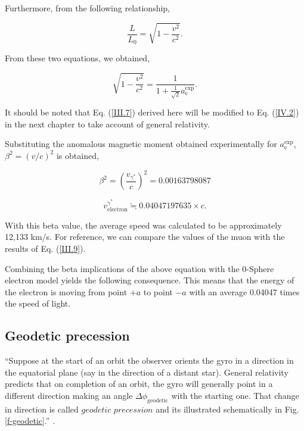 \documentclass[%
 reprint,
 amsmath,amssymb,
 aps,
]{revtex4-1}
\numberwithin{equation}{section}%
\begin{document}
Furthermore, from the following relationship,

    \begin{equation}
        \frac{L}{L_0} = \sqrt{1 - \frac{v^2}{c^2}} .
    \end{equation}

From these two equations, we obtained,

    \begin{equation}
        \sqrt{1 - \frac{v^2}{c^2}} = \frac{1}{1 + \frac{1}{\sqrt{2}} a^{\text{exp}}_{\text{e}}}  .
        \label{III.7}
    \end{equation}

It should be noted that Eq. (\ref{III.7}) derived here will be modified to Eq. (\ref{IV.2}) in the next chapter to take account of general relativity.

Substituting the anomalous magnetic moment obtained experimentally for $a^{\text{exp}}_{\text{e}}$, $\beta^2 = (v/{c})^2$ is obtained,

    \begin{equation}
        \beta^2 = (\frac{v_{\gamma^{*}}}{c})^2 = 0.00163798087
    \end{equation}

    \begin{equation}
        v_{\text{electron}}^{\gamma^{*}} \fallingdotseq 0.04047197635 \times c .
        \label{III.9}
    \end{equation}

With this beta value, the average speed was calculated to be approximately 12,133 km/s. For reference, we can compare the values of the muon with the results of Eq. (\ref{III.9}). 

Combining the beta implications of the above equation with the 0-Sphere electron model yields the following consequence. This means that the energy of the electron is moving from point $+a$ to point $-a$ with an average 0.04047 times the speed of light.


\subsection{\label{sec:Geodetic precession}{Geodetic precession}}

``Suppose at the start of an orbit the observer orients the gyro in a direction in the equatorial plane (say in the direction of a distant star). General relativity predicts that on completion of an orbit, the gyro will generally point in a different direction making an angle $\Delta \phi_{\mathrm{geodetic}}$ with the starting one. That change in direction is called $\textit{geodetic precession}$ and its illustrated schematically in Fig. \ref{f-geodetic}.'' \cite{Hartle}.
\end{document}
